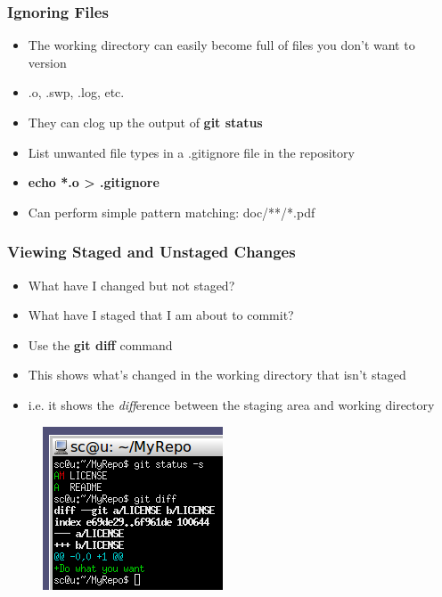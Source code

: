 \documentclass{beamer}
\begin{document}
\begin{frame}
	\frametitle{Ignoring Files}
	\begin{itemize}
		\item{The working directory can easily become full of files you don't want to version}
		\item{.o, .swp, .log, etc.}
		\item{They can clog up the output of \textbf{git status}}
		\item{List unwanted file types in a .gitignore file in the repository}
		\item{\textbf{echo *.o \textgreater{} .gitignore}}
		\item{Can perform simple pattern matching: doc/**/*.pdf}
	\end{itemize}
\end{frame}

\begin{frame}
	\frametitle{Viewing Staged and Unstaged Changes}
	\begin{itemize}
		\item{What have I changed but not staged?}
		\item{What have I staged that I am about to commit?}
		\item{Use the \textbf{git diff} command}
		\item{This shows what's changed in the working directory that isn't staged}
		\item{i.e. it shows the \textit{diff}erence between the staging area and working directory}
	\end{itemize}
	\begin{figure}
		\includegraphics[scale=0.62]{Viewing_Staged_and_Unstaged_Changes-0.png}
	\end{figure}
\end{frame}
\end{document}
